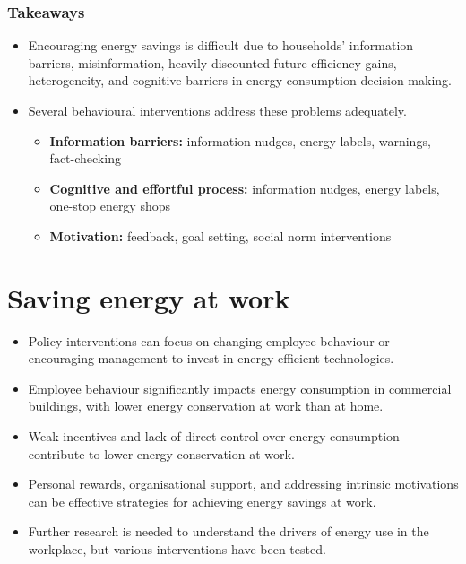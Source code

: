 \documentclass[
  12pt,
  captions=heading]{scrreport}
\begin{document}
\hypertarget{takeaways}{%
\subsection*{Takeaways}\label{takeaways}}

\begin{itemize}
\item
  Encouraging energy savings is difficult due to households' information
  barriers, misinformation, heavily discounted future efficiency gains,
  heterogeneity, and cognitive barriers in energy consumption
  decision-making.
\item
  Several behavioural interventions address these problems adequately.

  \begin{itemize}
  \item
    \textbf{Information barriers:} information nudges, energy labels,
    warnings, fact-checking
  \item
    \textbf{Cognitive and effortful process:} information nudges, energy
    labels, one-stop energy shops
  \item
    \textbf{Motivation:} feedback, goal setting, social norm
    interventions
  \end{itemize}
\end{itemize}

\hypertarget{sec:work}{%
\chapter{Saving energy at work}\label{sec:work}}

\begin{keypoints}
\begin{itemize}[leftmargin=*,labelsep=5mm]
    \item Policy interventions can focus on changing employee behaviour or encouraging management to invest in energy-efficient technologies.
    \item Employee behaviour significantly impacts energy consumption in commercial buildings, with lower energy conservation at work than at home.
    \item Weak incentives and lack of direct control over energy consumption contribute to lower energy conservation at work.
    \item Personal rewards, organisational support, and addressing intrinsic motivations can be effective strategies for achieving energy savings at work.
    \item Further research is needed to understand the drivers of energy use in the workplace, but various interventions have been tested.
\end{itemize}
\end{keypoints}
\end{document}
